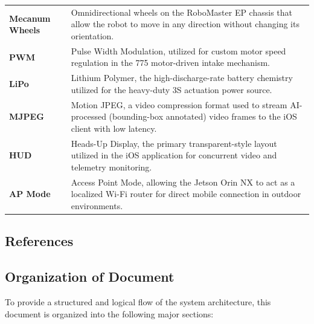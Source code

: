 {\begin{longtable}{p{3.5cm} p{10.0cm}}
\textbf{Mecanum Wheels} 
& Omnidirectional wheels on the RoboMaster EP chassis that allow the robot to move in any direction without changing its orientation. \\

\textbf{PWM} 
& Pulse Width Modulation, utilized for custom motor speed regulation in the 775 motor-driven intake mechanism. \\

\textbf{LiPo}
& Lithium Polymer, the high-discharge-rate battery chemistry utilized for the heavy-duty 3S actuation power source. \\

\textbf{MJPEG} 
& Motion JPEG, a video compression format used to stream AI-processed (bounding-box annotated) video frames to the iOS client with low latency. \\

\textbf{HUD}
& Heads-Up Display, the primary transparent-style layout utilized in the iOS application for concurrent video and telemetry monitoring. \\

\textbf{AP Mode}
& Access Point Mode, allowing the Jetson Orin NX to act as a localized Wi-Fi router for direct mobile connection in outdoor environments. \\

\end{longtable}
}


\subsection{References}
\label{sec:references}
{
  \hypersetup{urlcolor=black}
  \printbibliography[heading=none]
}


\subsection{Organization of Document}
\label{sec:organization}
To provide a structured and logical flow of the system architecture, this document is organized into the following major sections:

